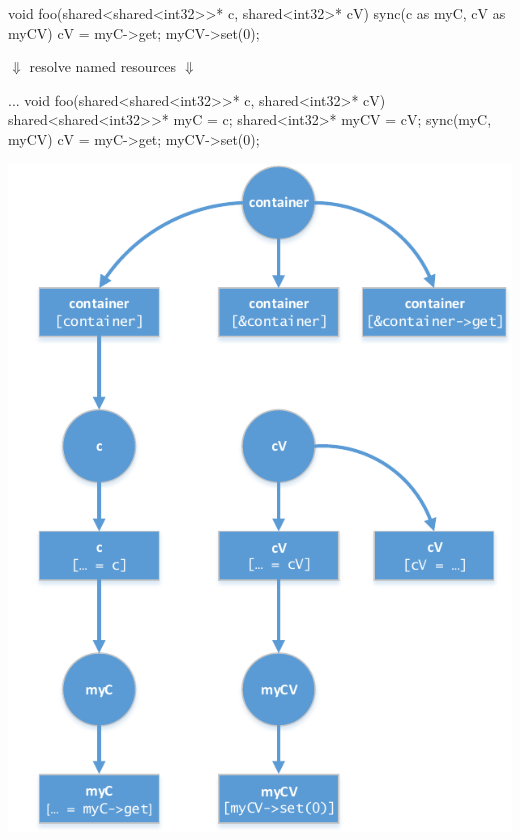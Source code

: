 \begin{minipage}{1\textwidth}
\begin{center}
\begin{minipage}{0.4\textwidth}
\begin{ccode}{}
void foo(shared<shared<int32>>* c, 
         shared<int32>* cV) {
  sync(c as myC, cV as myCV) {
    cV = myC->get;
    myCV->set(0);
  }
}
\end{ccode}
\centering $\Downarrow$ resolve named resources $\Downarrow$ 
\begin{ccode}{}
...
void foo(shared<shared<int32>>* c, 
         shared<int32>* cV) {
  shared<shared<int32>>* myC = c;
  shared<int32>* myCV = cV;
  sync(myC, myCV) {
    cV = myC->get;
    myCV->set(0);
  }
}
\end{ccode}
\end{minipage}
\begin{minipage}{0.58\textwidth}
\includegraphics[scale=0.98]{pics/DataFlowDiagram}
\end{minipage}
\end{center}
\label{fig:dataFlowGraph}
\end{minipage}

